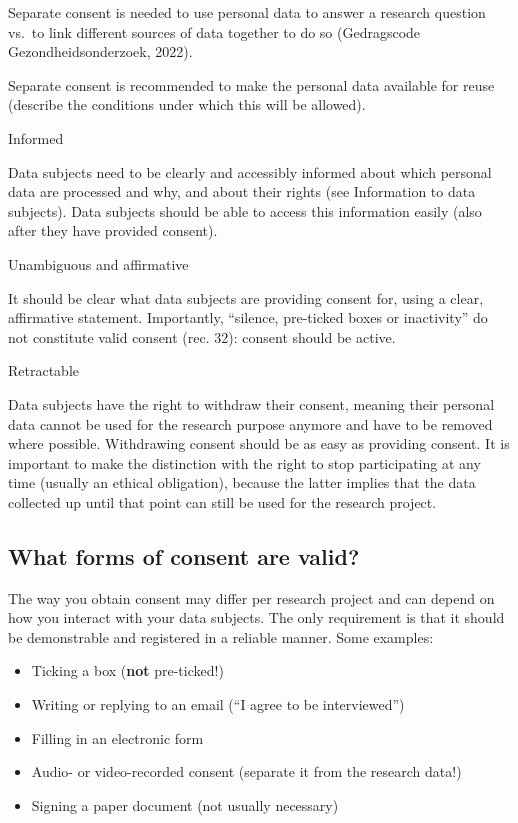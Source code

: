 \documentclass[
]{book}
\providecommand{\tightlist}{%
  \setlength{\itemsep}{0pt}\setlength{\parskip}{0pt}}
\begin{document}
Separate consent is needed to use personal data to answer a research question
vs.~to link different sources of data together to do so
(Gedragscode Gezondheidsonderzoek, 2022).

Separate consent is recommended to make the personal data
available for reuse (describe the
conditions under which this will be allowed).

Informed

Data subjects need to be clearly and accessibly informed about which personal
data are processed and why, and about their rights (see
Information to data subjects). Data subjects should be
able to access this information easily (also after they have provided
consent).

Unambiguous and affirmative

It should be clear what data subjects are providing consent for, using
a clear, affirmative statement. Importantly, ``silence, pre-ticked boxes or
inactivity'' do not constitute valid consent
(rec. 32):
consent should be active.

Retractable

Data subjects have the
right to withdraw their consent, meaning
their personal data cannot be used for the research purpose anymore and have to
be removed where possible. Withdrawing consent should be as easy as providing
consent. It is important to make the distinction with the right to stop
participating at any time (usually an ethical obligation), because the latter
implies that the data collected up until that point can still be used for the
research project.

\hypertarget{forms-consent}{%
\subsection{What forms of consent are valid?}\label{forms-consent}}

The way you obtain consent may differ per research project and can depend on
how you interact with your data subjects. The only requirement is that it should
be demonstrable and registered in a reliable manner. Some examples:

\begin{itemize}
\tightlist
\item
  Ticking a box (\textbf{not} pre-ticked!)
\item
  Writing or replying to an email (``I agree to be interviewed'')
\item
  Filling in an electronic form
\item
  Audio- or video-recorded consent (separate it from the research data!)
\item
  Signing a paper document (not usually necessary)
\end{itemize}
\end{document}
